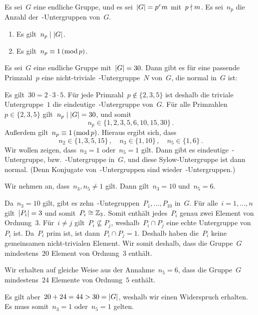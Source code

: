\begin{theorem}
  Es sei~$G$ eine endliche Gruppe, und es sei~$\lvert G\rvert = p^r m$ mit~$p \nmid m$.
  Es sei~$n_p$ die Anzahl der~-Untergruppen von~$G$.
  \begin{enumerate}
    \item
      Es gilt~$n_p \mid \lvert G\rvert$.
    \item
      Es gilt~$n_p \equiv 1 \,(\operatorname{mod} p)$.
  \end{enumerate}
\end{theorem}

\begin{example}[Erstklausur 19/20]
  Es sei~$G$ eine endliche Gruppe mit~$\lvert G\rvert = 30$.
  Dann gibt es für eine passende Primzahl~$p$ eine nicht-triviale~-Untergruppe~$N$ von~$G$, die normal in~$G$ ist:

  Es gilt~$30 = 2 \cdot 3 \cdot 5$.
  Für jede Primzahl~$p \notin \{ 2, 3, 5 \}$ ist deshalb die triviale Untergruppe~$1$ die eindeutige~-Untergruppe von~$G$.
  Für alle Primzahlen~$p \in \{2, 3, 5\}$ gilt~$n_p \mid \lvert G\rvert = 30$, und somit
  \[
    n_p \in \{ 1, 2, 3, 5, 6, 10, 15, 30 \} \,.
  \]
  Außerdem gilt~$n_p \equiv 1 \,(\operatorname{mod} p)$.
  Hieraus ergibt sich, dass
  \[
    n_2 \in \{ 1, 3, 5, 15 \} \,,
    \quad
    n_3 \in \{ 1, 10 \} \,,
    \quad
    n_5 \in \{ 1, 6 \} \,.
  \]
  Wir wollen zeigen, dass~$n_3 = 1$ oder~$n_5 = 1$ gilt.
  Dann gibt es eindeutige~-Untergruppe, bzw.~-Untergruppe in~$G$, und diese Sylow-Untergruppe ist dann normal.
  (Denn Konjugate von~-Untergruppen sind wieder~-Untergruppen.)
  
  Wir nehmen an, dass~$n_3, n_5 \neq 1$ gilt.
  Dann gilt~$n_3 = 10$ und~$n_5 = 6$.

  Da~$n_3 = 10$ gilt, gibt es zehn~-Untegruppen~$P_1, \dotsc, P_{10}$ in~$G$.
  Für alle~$i = 1, \dotsc, n$ gilt~$\lvert P_i\rvert = 3$ und somit~$P_i \cong \mathbb{Z}_3$.
  Somit enthält jedes~$P_i$ genau zwei Element von Ordnung~$3$.
  Für~$i \neq j$ gilt~$P_i \nsubseteq P_j$, weshalb~$P_i \cap P_j$ eine echte Untergruppe von~$P_i$ ist.
  Da~$P_i$ prim ist, ist dann~$P_i \cap P_j = 1$.
  Deshalb haben die~$P_i$ keine gemeinsamen nicht-trivialen Element.
  Wir somit deshalb, dass die Gruppe~$G$ mindestens~$20$ Element von Ordnung~$3$ enthält.

  Wir erhalten auf gleiche Weise aus der Annahme~$n_5 = 6$, dass die Gruppe~$G$ mindestens~$24$ Elemente von Ordnung~$5$ enthält.

  Es gilt aber~$20 + 24 = 44 > 30 = \lvert G\rvert$, weshalb wir einen Widerspruch erhalten.
  Es muss somit~$n_3 = 1$ oder~$n_5 = 1$ gelten.

\end{example}


